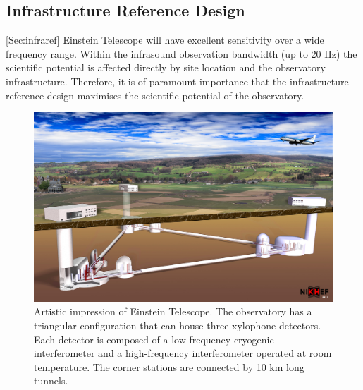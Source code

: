 \FloatBarrier
\subsection{Infrastructure Reference Design}[Sec:infraref]
Einstein Telescope will have excellent sensitivity over a wide frequency range. Within the infrasound observation bandwidth (up to 20 Hz) the scientific potential is affected directly by site location and the observatory infrastructure. Therefore, it is of paramount importance that the infrastructure reference design maximises the scientific potential of the observatory. 
\begin{figure}[h!]
	\centering
		\includegraphics[width=17cm]{./Sec_SiteInfra/Figures/ArtisticView2.jpg}
		\caption{Artistic impression of Einstein Telescope. The observatory has a triangular configuration that can house three xylophone detectors. Each detector is composed of a low-frequency cryogenic interferometer and a high-frequency interferometer operated at room temperature. The corner stations are connected by 10 km long tunnels.}
		\label{Landscape}
\end{figure}

